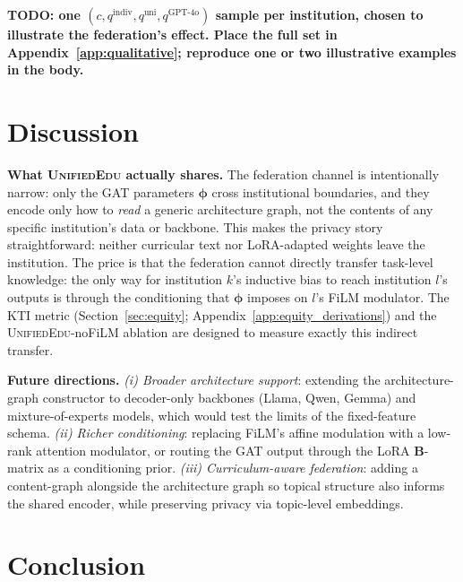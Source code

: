 \documentclass[11pt]{article}
\theoremstyle{plain}
\theoremstyle{definition}
\theoremstyle{remark}
\newcommand{\red}[1]{\textcolor{myred}{\textbf{#1}}}
\newcommand{\UniEdu}{\textsc{UnifiedEdu}}
\newcommand{\indiv}{\text{indiv}}
\newcommand{\uni}{\text{uni}}
\begin{document}
\red{TODO: one $(c, q^{\indiv}, q^{\uni}, q^{\text{GPT-4o}})$ sample per institution, chosen to illustrate the federation's effect. Place the full set in Appendix~\ref{app:qualitative}; reproduce one or two illustrative examples in the body.}

\section{Discussion}
\label{sec:discussion}

\textbf{What \UniEdu{} actually shares.}
The federation channel is intentionally narrow: only
the GAT parameters $\boldsymbol{\phi}$ cross
institutional boundaries, and they encode only how to
\emph{read} a generic architecture graph, not the
contents of any specific institution's data or
backbone. This makes the privacy story
straightforward: neither curricular text nor
LoRA-adapted weights leave the institution. The price
is that the federation cannot directly transfer
task-level knowledge: the only way for institution
$k$'s inductive bias to reach institution $l$'s
outputs is through the conditioning that
$\boldsymbol{\phi}$ imposes on $l$'s FiLM modulator.
The KTI metric (Section~\ref{sec:equity};
Appendix~\ref{app:equity_derivations}) and the
\UniEdu{}-noFiLM ablation are designed to measure
exactly this indirect transfer.

\textbf{Future directions.}
\emph{(i) Broader architecture support}: extending
the architecture-graph constructor to decoder-only
backbones (Llama, Qwen, Gemma) and mixture-of-experts
models, which would test the limits of the
fixed-feature schema.
\emph{(ii) Richer conditioning}: replacing FiLM's
affine modulation with a low-rank attention
modulator, or routing the GAT output through the
LoRA $\mathbf{B}$-matrix as a conditioning prior.
\emph{(iii) Curriculum-aware federation}: adding a
content-graph alongside the architecture graph so
topical structure also informs the shared encoder,
while preserving privacy via topic-level embeddings.

\section{Conclusion}
\label{sec:conclusion}
\end{document}
